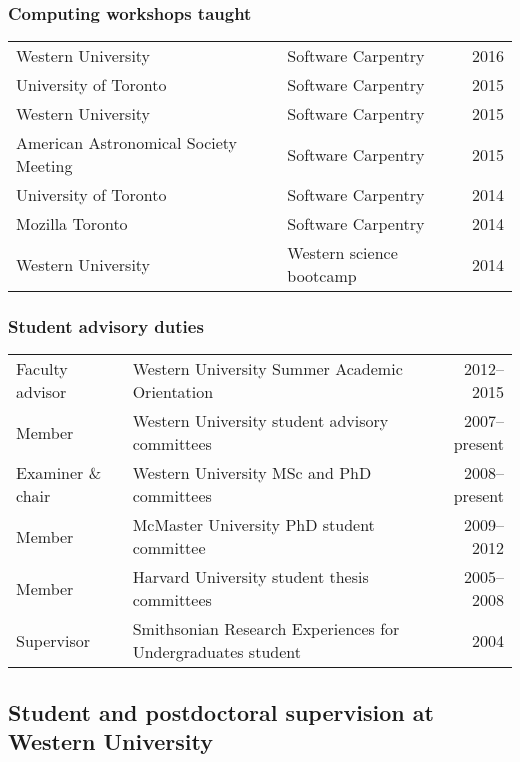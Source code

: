 \documentclass[12pt]{article}
\begin{document}
\subsubsection{Computing workshops taught}
\begin{tabularx}{\textwidth}{XXr}
Western University& Software Carpentry & 2016\\
University of Toronto & Software Carpentry & 2015\\
Western University & Software Carpentry &2015\\ %
American Astronomical Society Meeting  & Software Carpentry & 2015\\
University of Toronto & Software Carpentry & 2014\\
Mozilla Toronto & Software Carpentry & 2014\\
Western University & Western science bootcamp & 2014\\
\end{tabularx}


\subsubsection{Student advisory duties}
\begin{tabularx}{\textwidth}{lXr}
Faculty advisor& Western University Summer Academic Orientation & 2012--2015\\
Member &Western University student advisory committees & 2007--present\\
Examiner \& chair & Western University MSc and PhD committees& 2008--present\\
Member& McMaster University PhD student committee& 2009--2012\\
Member& Harvard University student thesis committees& 2005--2008\\
Supervisor& Smithsonian Research Experiences for Undergraduates student & 2004\\
\end{tabularx}



\subsection{Student and postdoctoral supervision at Western University}
\end{document}
